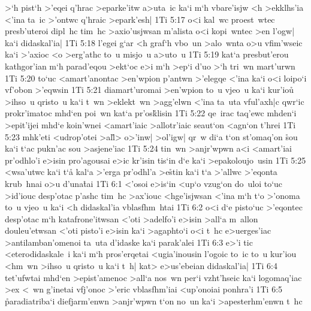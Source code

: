 >`h
pist`h
>'eqei
q'hrac
>eparke'itw
a>uta~ic
ka`i
m`h
vbare'isjw
<h
>ekklhs'ia
<'ina
ta~ic
>'ontwc
q'hraic
>epark'esh|\bibvsend
\vs 1Ti 5:17
o<i
kal~wc
proest~wtec
presb'uteroi
dipl~hc
tim~hc
>axio'usjwsan
m'alista
o<i
kopi~wntec
>en
l'ogw|
ka`i
didaskal'ia|\bibvsend
\vs 1Ti 5:18
l'egei
g`ar
<h
graf`h
vbo~un
>alo~wnta
o>u
vfim'wseic
ka`i
>'axioc
<o
>erg'athc
to~u
misjo~u
a>uto~u\bibvsend
\vs 1Ti 5:19
kat`a
presbut'erou
kathgor'ian
m`h
parad'eqou
>ekt`oc
e>i
m`h
>ep`i
d'uo
>`h
tri~wn
mart'urwn\bibvsend
\vs 1Ti 5:20
to`uc
<amart'anontac
>en'wpion
p'antwn
>'elegqe
<'ina
ka`i
o<i
loipo`i
vf'obon
>'eqwsin\bibvsend
\vs 1Ti 5:21
diamart'uromai
>en'wpion
to~u
vjeo~u
ka`i
kur'iou\r{}
>ihso~u
qristo~u
ka`i
t~wn
>eklekt~wn
>agg'elwn
<'ina
ta~uta
vful'axh|c
qwr`ic
prokr'imatoc
mhd`en
poi~wn
kat`a
pr'os\r{k}lisin\bibvsend
{}
\vs 1Ti 5:22
qe~irac
taq'ewc
mhden`i
>epit'ijei
mhd`e
koin'wnei
<amart'iaic
>allotr'iaic
seaut`on
<agn`on
t'hrei\bibvsend
\vs 1Ti 5:23
mhk'eti
<udrop'otei
>al\r{l}>
o>'inw|
>ol'igw|
qr~w
di`a
t`on
st'omaq'on
\r{s}ou
ka`i
t`ac
pukn'ac
sou
>asjene'iac\bibvsend
\vs 1Ti 5:24
tin~wn
>anjr'wpwn
a<i
<amart'iai
pr'odhlo'i
e>isin
pro'agousai
e>ic
kr'isin
tis`in
d`e
ka`i
>epakoloujo~usin\bibvsend
\vs 1Ti 5:25
<wsa'utwc
ka`i
t`a\r{}
kal`a
>'erga
pr'odhl'a
>e\r{s}tin
ka`i
t`a
>'allwc
>'eqonta
krub~hnai
o>u
d'una\r{t}ai\bibvsend
{}
\vs 1Ti 6:1
<'osoi
e>is`in
<up`o
vzug`on
do~uloi
to`uc
>id'iouc
desp'otac
p'ashc
tim~hc
>ax'iouc
<hge'isjwsan
<'ina
m`h
t`o
>'onoma
to~u
vjeo~u
ka`i
<h
didaskal'ia
vblasfhm~htai\bibvsend
\vs 1Ti 6:2
o<i
d`e
pisto`uc
>'eqontec
desp'otac
m`h
katafrone'itwsan
<'oti
>adelfo'i
e>isin
>all`a
m~allon
douleu'etwsan
<'oti
pisto'i
e>isin
ka`i
>agaphto`i
o<i
t~hc
e>uerges'iac
>antilamban'omenoi
ta~uta
d'idaske
ka`i
parak'alei\bibvsend
\vs 1Ti 6:3
e>'i
tic
<eterodidaskale~i
ka`i
m`h
pros'erqetai
<ugia'inousin
l'ogoic
to~ic
to~u
kur'iou
<hm~wn
>ihso~u
qristo~u
ka`i
t~h|
kat>
e>us'ebeian
didaskal'ia|\bibvsend
\vs 1Ti 6:4
tet'ufwtai
mhd`en
>epist'amenoc
>all`a
nos~wn
per`i
vzht'hseic
ka`i
logomaq'iac
>ex
<~wn
g'inetai
vfj'onoc
>'eric
vblasfhm'iai
<up'onoiai
ponhra'i\bibvsend
\vs 1Ti 6:5
\r{p}aradiatriba`i
diefjarm'enwn
>anjr'wpwn
t`on
no~un
ka`i
>apesterhm'enwn
t~hc
